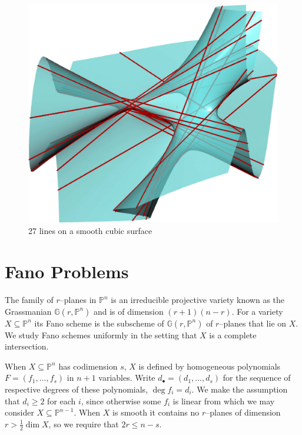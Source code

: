 \documentclass[12pt]{amsart}
\theoremstyle{definition}
\newcommand{\gr}{\mathbb{G}}
\newcommand{\defcolor}[1]{{\color{RoyalBlue}#1}}
\begin{document}
\begin{center}
\begin{figure}[h]
  \includegraphics[scale=.38]{figures/27lines.pdf}
  \caption{27 lines on a smooth cubic surface}
\end{figure}
\end{center}



\section{Fano Problems}
The family of $r$--planes in $\mathbb{P}^n$ is an irreducible projective variety known as the Grassmanian $\gr(r,\mathbb{P}^n)$ and is of dimension $(r+1)(n-r)$. For a variety $X\subseteq\mathbb{P}^n$ its \defcolor{Fano scheme} is the subscheme of $\gr(r,\mathbb{P}^n)$ of $r$--planes that lie on $X$. We study Fano schemes uniformly in the setting that $X$ is a complete intersection.

When $X\subseteq\mathbb{P}^n$ has codimension $s$, $X$ is defined by homogeneous polynomials $F = (f_1,\dotsc,f_s)$ in $n+1$ variables. Write $d_\bullet = (d_1,\dotsc,d_s)$ for the sequence of respective degrees of these polynomials, $\deg f_i = d_i$. We make the assumption that $d_i\ge 2$ for each $i$, since otherwise some $f_i$ is linear from which we may consider $X\subseteq\mathbb{P}^{n-1}$. When $X$ is smooth it contains no $r$--planes of dimension $r>\frac{1}{2}\dim X$, so we require that $2r\le n-s$.
\end{document}

